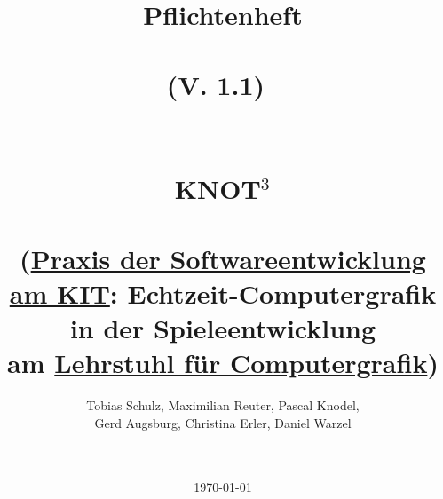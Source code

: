 %
%


%
%







	\title{	
		Pflichtenheft\\~\\\textmd{\Large(V. 1.1)}~\\~\\~\\
		\Huge{KNOT$^3$}\\~\\
		\Large (\href{http://pp.info.uni-karlsruhe.de/lehre/WS201314/pse/}{Praxis der Softwareentwicklung am KIT}: Echtzeit-Computergrafik in der Spieleentwicklung \\am \href{http://cg.ibds.kit.edu/index.php}{Lehrstuhl für Computergrafik})
	}
	
	\author{
		Tobias Schulz, Maximilian Reuter, Pascal Knodel,\\
	 	Gerd Augsburg, Christina Erler, Daniel Warzel
	} 
	 
	\date{~\\~\\\today}
	
	\maketitle





